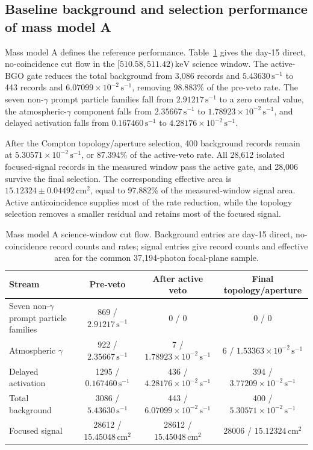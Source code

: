 \documentclass[11pt]{article}
\newcommand{\revblue}[1]{\textcolor{revisionblue}{#1}}
\newcommand{\keV}{\ensuremath{\,\mathrm{keV}}}
\newcommand{\cps}{\ensuremath{\,\mathrm{s^{-1}}}}
\begin{document}
\subsection{Baseline background and selection performance of mass model A}
\label{subsec:model_a_baseline}
\label{subsec:reference_background_results}

Mass model A defines the reference performance. Table~\ref{tab:phase2_cutflow} gives the day-15 direct, no-coincidence cut flow in the $[510.58,511.42)\keV$ science window. The active-BGO gate reduces the total background from 3,086 records and $5.43630\cps$ to 443 records and $6.07099\times10^{-2}\cps$, removing 98.883\% of the pre-veto rate. The \revblue{seven non-$\gamma$ prompt particle families} fall from $2.91217\cps$ to a zero central value, the \revblue{atmospheric-$\gamma$ component} falls from $2.35667\cps$ to $1.78923\times10^{-2}\cps$, and delayed activation falls from $0.167460\cps$ to $4.28176\times10^{-2}\cps$.

After the Compton topology/aperture selection, 400 background records remain at $5.30571\times10^{-2}\cps$, or 87.394\% of the active-veto rate. All 28,612 isolated focused-signal records in the measured window pass the active gate, and 28,006 survive the final selection. The corresponding effective area is $15.12324\pm0.04492\,\mathrm{cm^2}$, equal to 97.882\% of the measured-window signal area. Active anticoincidence supplies most of the rate reduction, while the topology selection removes a smaller residual and retains most of the focused signal.

\begin{table}[H]
\centering
\caption{Mass model A science-window cut flow. Background entries are day-15 direct, no-coincidence record counts and rates; signal entries give record counts and effective area for the common 37,194-photon focal-plane sample.}
\label{tab:phase2_cutflow}
\footnotesize
\begin{tabular}{lccc}
\toprule
Stream & Pre-veto & After active veto & Final topology/aperture \\
\midrule
\revblue{Seven non-$\gamma$ prompt particle families} & 869 / $2.91217\cps$ & 0 / 0 & 0 / 0 \\
\revblue{Atmospheric $\gamma$} & 922 / $2.35667\cps$ & 7 / $1.78923\times10^{-2}\cps$ & 6 / $1.53363\times10^{-2}\cps$ \\
Delayed activation & 1295 / $0.167460\cps$ & 436 / $4.28176\times10^{-2}\cps$ & 394 / $3.77209\times10^{-2}\cps$ \\
Total background & 3086 / $5.43630\cps$ & 443 / $6.07099\times10^{-2}\cps$ & 400 / $5.30571\times10^{-2}\cps$ \\
Focused signal & 28612 / $15.45048\,\mathrm{cm^2}$ & 28612 / $15.45048\,\mathrm{cm^2}$ & 28006 / $15.12324\,\mathrm{cm^2}$ \\
\bottomrule
\end{tabular}
\end{table}
\end{document}
